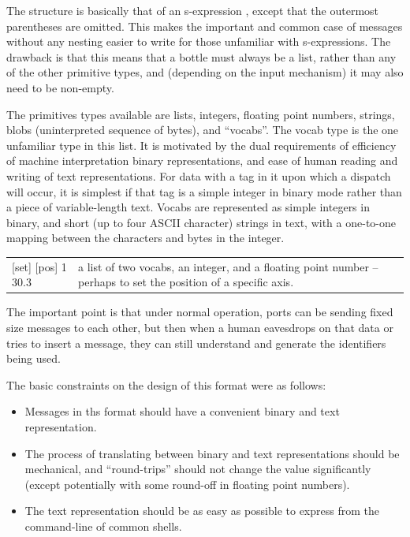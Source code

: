 The structure is basically that of an s-expression
\cite{rivest1997sexp}, except that the outermost parentheses are
omitted.  This makes the important and common case of messages without
any nesting easier to write for those unfamiliar with s-expressions.
The drawback is that this means that a bottle must always be a list,
rather than any of the other primitive types, and (depending on the
input mechanism) it may also need to be non-empty.

The primitives types available are lists, integers, floating point
numbers, strings, blobs (uninterpreted sequence of bytes), and
``vocabs''.  The vocab type is the one unfamiliar type in this list.
It is motivated by the dual requirements of efficiency of machine
interpretation binary representations, and ease of human reading and
writing of text representations.  For data with a tag in it upon which
a dispatch will occur, it is simplest if that tag is a simple integer
in binary mode rather than a piece of variable-length text.
Vocabs are represented as simple integers in binary, and short
(up to four ASCII character) strings in text, with a one-to-one
mapping between the characters and bytes in the integer.  


\begin{tabular}{p{5cm}p{6cm}}
[set] [pos] 1 30.3 & a list of two vocabs, an integer, and a floating
point number -- perhaps to set the position of a specific axis.
\end{tabular}

The important point is that under normal operation, ports can be
sending fixed size messages to each other, but then when a human
eavesdrops on that data or tries to insert a message, they can still
understand and generate the identifiers being used.


The basic constraints on the design of this format were as follows:

\begin{itemize}

\item Messages in ths format should have a convenient binary and text
representation.

\item The process of translating between binary and text
representations should be mechanical, and ``round-trips'' should not
change the value significantly (except potentially with some round-off
in floating point numbers).

\item The text representation should be as easy as possible
to express from the command-line of common shells.

\end{itemize}

